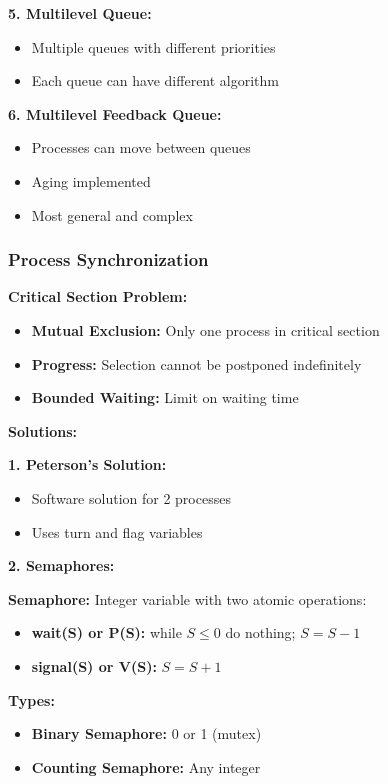 \documentclass[11pt,a4paper]{article}
\begin{document}
\textbf{5. Multilevel Queue:}
\begin{itemize}
    \item Multiple queues with different priorities
    \item Each queue can have different algorithm
\end{itemize}

\textbf{6. Multilevel Feedback Queue:}
\begin{itemize}
    \item Processes can move between queues
    \item Aging implemented
    \item Most general and complex
\end{itemize}

\subsubsection{Process Synchronization}

\textbf{Critical Section Problem:}
\begin{itemize}
    \item \textbf{Mutual Exclusion:} Only one process in critical section
    \item \textbf{Progress:} Selection cannot be postponed indefinitely
    \item \textbf{Bounded Waiting:} Limit on waiting time
\end{itemize}

\textbf{Solutions:}

\textbf{1. Peterson's Solution:}
\begin{itemize}
    \item Software solution for 2 processes
    \item Uses turn and flag variables
\end{itemize}

\textbf{2. Semaphores:}
\begin{defbox}
\textbf{Semaphore:} Integer variable with two atomic operations:
\begin{itemize}
    \item \textbf{wait(S) or P(S):} while $S \leq 0$ do nothing; $S = S - 1$
    \item \textbf{signal(S) or V(S):} $S = S + 1$
\end{itemize}
\end{defbox}

\textbf{Types:}
\begin{itemize}
    \item \textbf{Binary Semaphore:} 0 or 1 (mutex)
    \item \textbf{Counting Semaphore:} Any integer
\end{itemize}
\end{document}

